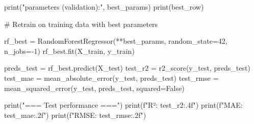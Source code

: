 print("\nBest parameters (validation):", best_params)
print(best_row)


# Retrain on training data with best parameters

rf_best = RandomForestRegressor(**best_params, random_state=42, n_jobs=-1)
rf_best.fit(X_train, y_train)

preds_test = rf_best.predict(X_test)
test_r2 = r2_score(y_test, preds_test)
test_mae = mean_absolute_error(y_test, preds_test)
test_rmse = mean_squared_error(y_test, preds_test, squared=False)

print("\n=== Test performance ===")
print(f"R²:   {test_r2:.4f}")
print(f"MAE:  {test_mae:.2f}")
print(f"RMSE: {test_rmse:.2f}")
